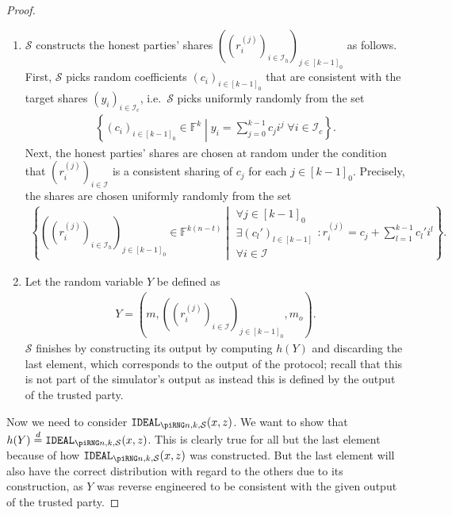 \documentclass{article}
\newcommand{\eqd}[0]{\stackrel{d}{=}}
\newcommand{\set}[2]{\left\{ #1 \middle| #2 \right\}}
\newcommand{\seq}[1]{\left[#1\right]}
\newcommand{\seqZ}[1]{\left[#1\right]_0}
\theoremstyle{remark}
\newcommand{\F}{\mathbb{F}}
\begin{document}
\begin{proof}
\begin{enumerate}
		\item $\mathcal{S}$ constructs the honest parties' shares
			${\left({\left(r_i^{(j)}\right)}_{i \in \mathcal{I}_h}\right)}_{j
			\in \seqZ{k-1}}$ as follows. First, $\mathcal{S}$ picks random
			coefficients ${(c_i)}_{i \in \seqZ{k-1}}$ that are consistent with
			the target shares ${(y_i)}_{i \in \mathcal{I}_c}$, i.e.\
			$\mathcal{S}$ picks uniformly randomly from the set
			\begin{align*}
				\set{%
					{(c_i)}_{i \in \seqZ{k-1}} \in \F^k
				}{%
					y_i = \sum_{j=0}^{k-1} c_j i^j
					\;
					\forall i \in \mathcal{I}_c
				}.
			\end{align*}
			Next, the honest parties' shares are chosen at random under the
			condition that ${\left(r_i^{(j)}\right)}_{i \in \mathcal{I}}$ is a
			consistent sharing of $c_j$ for each $j \in \seqZ{k-1}$. Precisely,
			the shares are chosen uniformly randomly from the set
			\begin{align*}
				\set{%
					{\left(
						{\left(
							r_i^{(j)}
						\right)}_{i \in \mathcal{I}_h}\right)
					}_{j \in \seqZ{k-1}}
					\in
					\F^{k(n-t)}
				}{%
					\begin{matrix}
						\forall j \in \seqZ{k-1}\\
						\exists {(c_l')}_{l \in \seq{k-1}}\\
						\forall i \in \mathcal{I}
					\end{matrix}
					:
					r_i^{(j)} = c_j + \sum_{l=1}^{k-1} c_l' i^l
				}.
			\end{align*}

		\item Let the random variable $Y$ be defined as
			\begin{align*}
				Y =
				\left(
					m,
					{\left(
						{\left(r_i^{(j)}\right)}_{i \in \mathcal{I}}
					\right)}_{j \in \seqZ{k-1}},
					m_o
				\right).
			\end{align*}
			$\mathcal{S}$ finishes by constructing its output by computing
			$h(Y)$ and discarding the last element, which corresponds to the
			output of the protocol; recall that this is not part of the
			simulator's output as instead this is defined by the output of the
			trusted party.
	\end{enumerate}

	Now we need to consider $\idealD$. We want to show that $h(Y) \eqd
	\idealD$. This is clearly true for all but the last element because of how
	$\idealD$ was constructed. But the last element will also have the correct
	distribution with regard to the others due to its construction, as $Y$ was
	reverse engineered to be consistent with the given output of the trusted
	party.


\end{proof}
\end{document}
